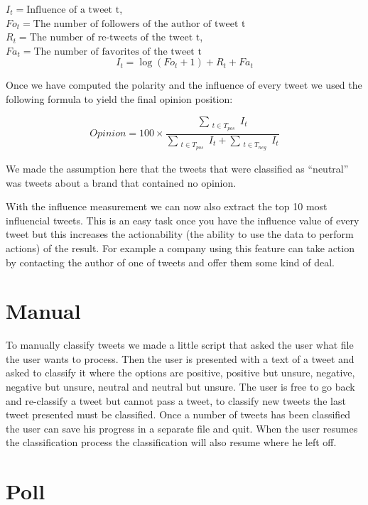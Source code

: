 \documentclass[a4paper,12pt]{report}
\begin{document}
$I_t = \text{Influence of a tweet t}$, $Fo_t = \text{The number of followers of the author of tweet t}$\\
$R_t = \text{The number of re-tweets of the tweet t}$, $Fa_t = \text{The number of favorites of the tweet t}$\\
\begin{equation}
I_t = \log (Fo_t + 1) + R_t + Fa_t
\end{equation}

Once we have computed the polarity and the influence of every tweet we used the following formula to yield the final opinion position:

\begin{equation}
Opinion = 100 \times \frac{\sum_{\substack{t \in T_{pos}}} I_t}{\sum_{\substack{t \in T_{pos}}} I_t + \sum_{\substack{t \in T_{neg}}} I_t}
\end{equation}

We made the assumption here that the tweets that were classified as ``neutral'' was tweets about a brand that contained no opinion.

With the influence measurement we can now also extract the top 10 most influencial tweets. This is an easy task once you have the influence value of every tweet but this increases the actionability (the ability to use the data to perform actions) of the result. For example a company using this feature can take action by contacting the author of one of tweets and offer them some kind of deal.

\section{Manual}

To manually classify tweets we made a little script that asked the user what file the user wants to process. 
Then the user is presented with a text of a tweet and asked to classify it where the options are positive, positive but unsure, negative, negative but unsure, neutral and neutral but unsure. 
The user is free to go back and re-classify a tweet but cannot pass a tweet, to classify new tweets the last tweet presented must be classified. 
Once a number of tweets has been classified the user can save his progress in a separate file and quit. 
When the user resumes the classification process the classification will also resume where he left off.

\section{Poll}
\end{document}
